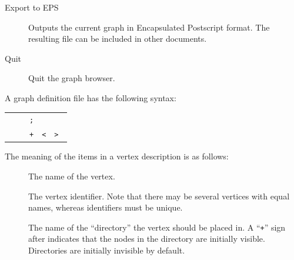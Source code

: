 \begin{isabellebody}
\begin{isamarkuptext}
\begin{description}
  \item[Export to EPS] Outputs the current graph in Encapsulated
  Postscript format. The resulting file can be included in other
  documents.

  \item[Quit] Quit the graph browser.

  \end{description}%
\end{isamarkuptext}%
\isamarkuptrue%
%
\isamarkuptrue%
%
\begin{isamarkuptext}%
A graph definition file has the following syntax:

  \begin{center}\small
  \begin{tabular}{rcl}
    \isa{graph} & \isa{{\isachardoublequote}{\isacharequal}{\isachardoublequote}} & \isa{{\isachardoublequote}{\isacharbraceleft}\ vertex{\isachardoublequote}}~\verb|;|~\isa{{\isachardoublequote}{\isacharbraceright}{\isacharplus}{\isachardoublequote}} \\
    \isa{vertex} & \isa{{\isachardoublequote}{\isacharequal}{\isachardoublequote}} & \isa{{\isachardoublequote}vertex{\isacharunderscore}name\ vertex{\isacharunderscore}ID\ dir{\isacharunderscore}name\ {\isacharbrackleft}{\isachardoublequote}}~\verb|+|~\isa{{\isachardoublequote}{\isacharbrackright}\ path\ {\isacharbrackleft}{\isachardoublequote}}~\verb|<|~\isa{{\isachardoublequote}{\isacharbar}{\isachardoublequote}}~\verb|>|~\isa{{\isachardoublequote}{\isacharbrackright}\ {\isacharbraceleft}\ vertex{\isacharunderscore}ID\ {\isacharbraceright}{\isacharasterisk}{\isachardoublequote}}
  \end{tabular}
  \end{center}

  The meaning of the items in a vertex description is as follows:

  \begin{description}
  
  \item[] The name of the vertex.
  
  \item[] The vertex identifier. Note that there may
  be several vertices with equal names, whereas identifiers must be
  unique.
  
  \item[] The name of the ``directory'' the vertex
  should be placed in.  A ``\verb|+|'' sign after  indicates that the nodes in the directory are initially
  visible. Directories are initially invisible by default.
  

\end{description}
\end{isamarkuptext}
\end{isabellebody}
